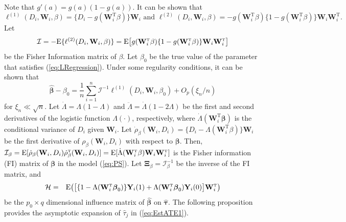 \documentclass[12pt]{article}
\def\be{\begin{equation}}
\def\ee{\end{equation}}
\def\bea{\begin{eqnarray}}
\def\eea{\end{eqnarray}}
\def\T{{ \mathrm{\scriptscriptstyle T} }}
\theoremstyle{definition}
\newcommand{\E}{\rm E}
\newcommand{\bW}{{\mathbf W}}
\newcommand{\bY}{{\mathbf Y}}
\newcommand{\bbeta}  {\boldsymbol{\beta}}
\newcommand{\bXi}{\boldsymbol{\Xi}}
\newcommand{\btau}{\boldsymbol{\tau}}
\begin{document}
Note that $g'(a) = g(a)(1 - g(a))$. It can be shown that
$$\ell^{(1)}(D_{i}, \bW_{i}, \beta) = \{D_{i} - g(\bW_{i}^{\T}\beta)\} \bW_{i} \mbox{ \ and \ }
\ell^{(2)}(D_{i}, \bW_{i}, \beta) = -g(\bW_{i}^{\T}\beta)\{1 - g(\bW_{i}^{\T}\beta)\} \bW_{i}\bW_{i}^{\T}.$$
Let $$\mathcal{I} = -{\E}\{\ell^{(2)}(D_{i}, \bW_{i}, \beta)\} = {\E}\big[g(\bW_{i}^{\T}\beta)\{1 - g(\bW_{i}^{\T}\beta)\} \bW_{i}\bW_{i}^{\T} \big]$$
be the Fisher Information matrix of $\beta$.
Let $\beta_{0}$ be the true value of the parameter that satisfies (\ref{eq:LRegression}). Under some regularity conditions, it can be shown that
\be
\hat{\bbeta} - \beta_{0} = \frac{1}{n}\sum_{i = 1}^{n} \mathcal{I}^{-1} \ell^{(1)}(D_{i}, \bW_{i}, \beta_{0}) + O_{p}(\xi_{n} / n)
\label{eq:MLEExpansion}\ee
for $\xi_{n} \ll \sqrt{n}$.
\fi
%
%
Let $\dot{\Lambda} = \Lambda(1 - \Lambda)$ and $\ddot{\Lambda} = \dot{\Lambda}(1 - 2\Lambda)$ be the first and second derivatives of the logistic function $\Lambda(\cdot)$, respectively, where $\dot{\Lambda}(\bW_{i}^{\T}\bbeta)$ is the conditional variance of $D_{i}$ given $\bW_{i}$.
Let $\dot{\rho}_{\beta}(\bW_{i}, D_{i}) = \{D_{i} - \Lambda(\bW_{i}^{\T}\beta)\} \bW_{i}$ be the first derivative of $\rho_{\beta}(\bW_{i}, D_{i})$ with respect to $\bbeta$.
Then, $\mathcal{I}_{\beta} = {\E}[\dot{\rho}_{\beta}(\bW_{i}, D_{i})\dot{\rho}_{\beta}^{\T}(\bW_{i}, D_{i})] = {\E}[\dot{\Lambda}(\bW_{i}^{\T}\beta) \bW_{i} \bW_{i}^{\T}]$ is the Fisher information (FI) matrix of $\bbeta$ in the model (\ref{eq:PS}). 
Let $\bXi_{\beta} = \mathcal{I}_{\beta}^{-1}$ be the inverse of the FI matrix, %
and
\bea
\mathcal{H} &=& {\E}\big( \big[ \{1 - \Lambda(\bW_{i}^{\T}\bbeta_{0})\} \bY_{i}(1) + \Lambda(\bW_{i}^{\T}\bbeta_{0})\bY_{i}(0) \big] \bW_{i}^{\T} \big)
\label{eq:HMatrix0}
\eea
be the $p_0 \times q$ dimensional influence matrix of $\hat{\bbeta}$ on $\hat{\btau}$. 
The following proposition provides the asymptotic expansion of $\hat{\tau}_j$ in (\ref{eq:EstATE1}).
\end{document}
